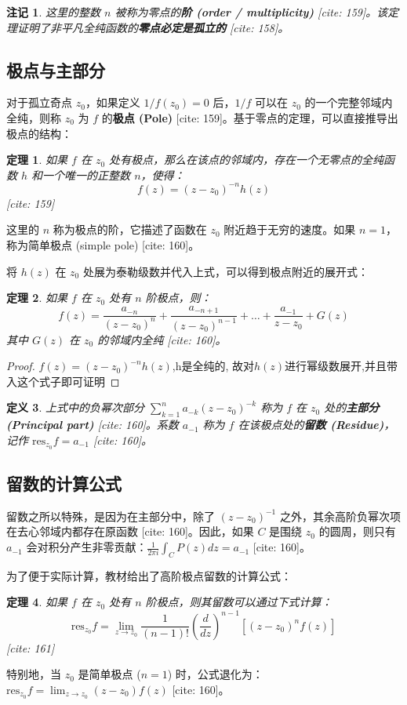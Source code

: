 \documentclass[UTF8]{ctexart}
\newtheorem{theorem}{定理}[section]
\newtheorem{definition}[theorem]{定义}
\newtheorem{remark}{注记}[section]
\numberwithin{equation}{section}
\begin{document}
\begin{remark}
这里的整数 $n$ 被称为零点的\textbf{阶 (order / multiplicity)} [cite: 159]。该定理证明了非平凡全纯函数的\textbf{零点必定是孤立的} [cite: 158]。
\end{remark}

\subsection{极点与主部分}
对于孤立奇点 $z_0$，如果定义 $1/f(z_0) = 0$ 后，$1/f$ 可以在 $z_0$ 的一个完整邻域内全纯，则称 $z_0$ 为 $f$ 的\textbf{极点 (Pole)} [cite: 159]。基于零点的定理，可以直接推导出极点的结构：

\begin{theorem}
如果 $f$ 在 $z_0$ 处有极点，那么在该点的邻域内，存在一个无零点的全纯函数 $h$ 和一个唯一的正整数 $n$，使得：
$$ f(z) = (z-z_0)^{-n} h(z) $$ [cite: 159]
\end{theorem}
这里的 $n$ 称为极点的阶，它描述了函数在 $z_0$ 附近趋于无穷的速度。如果 $n=1$，称为简单极点 (simple pole) [cite: 160]。

将 $h(z)$ 在 $z_0$ 处展为泰勒级数并代入上式，可以得到极点附近的展开式：
\begin{theorem}
如果 $f$ 在 $z_0$ 处有 $n$ 阶极点，则：
$$ f(z) = \frac{a_{-n}}{(z-z_0)^n} + \frac{a_{-n+1}}{(z-z_0)^{n-1}} + \dots + \frac{a_{-1}}{z-z_0} + G(z) $$
其中 $G(z)$ 在 $z_0$ 的邻域内全纯 [cite: 160]。
\end{theorem}

\begin{proof}
    $ f(z) = (z-z_0)^{-n} h(z) $,h是全纯的,
    故对$h(z)$进行幂级数展开,并且带入这个式子即可证明
\end{proof}

\begin{definition}
上式中的负幂次部分 $\sum_{k=1}^n a_{-k}(z-z_0)^{-k}$ 称为 $f$ 在 $z_0$ 处的\textbf{主部分 (Principal part)} [cite: 160]。系数 $a_{-1}$ 称为 $f$ 在该极点处的\textbf{留数 (Residue)}，记作 $\mathrm{res}_{z_0} f = a_{-1}$ [cite: 160]。
\end{definition}

\subsection{留数的计算公式}
留数之所以特殊，是因为在主部分中，除了 $(z-z_0)^{-1}$ 之外，其余高阶负幂次项在去心邻域内都存在原函数 [cite: 160]。因此，如果 $C$ 是围绕 $z_0$ 的圆周，则只有 $a_{-1}$ 会对积分产生非零贡献：$\frac{1}{2\pi i}\int_C P(z)dz = a_{-1}$ [cite: 160]。

为了便于实际计算，教材给出了高阶极点留数的计算公式：
\begin{theorem}
如果 $f$ 在 $z_0$ 处有 $n$ 阶极点，则其留数可以通过下式计算：
$$ \mathrm{res}_{z_0} f = \lim_{z \to z_0} \frac{1}{(n-1)!} \left(\frac{d}{dz}\right)^{n-1} \left[ (z-z_0)^n f(z) \right] $$ [cite: 161]
\end{theorem}
特别地，当 $z_0$ 是简单极点 ($n=1$) 时，公式退化为：$\mathrm{res}_{z_0} f = \lim_{z \to z_0} (z-z_0)f(z)$ [cite: 160]。
\end{document}
